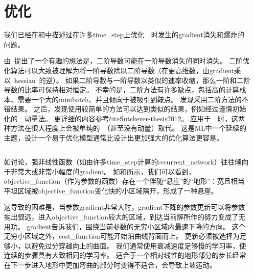 \section{优化}
\label{sec:optimization_for_long_term_dependencies}
我们已经在和中描述过在许多\gls{time_step}上优化~~时发生的\gls{gradient}消失和爆炸的问题。

由~\cite{Martens+Sutskever-ICML2011}提出了一个有趣的想法是，二阶导数可能在一阶导数消失的同时消失。
二阶优化算法可以大致被理解为将一阶导数除以二阶导数（在更高维数，由\gls{gradient}乘以~\gls{hessian}~的逆）。
如果二阶导数与一阶导数以类似的速率收缩，那么一阶和二阶导数的比率可保持相对恒定。
不幸的是，二阶方法有许多缺点，包括高的计算成本、需要一个大的\gls{minibatch}、并且倾向于被吸引到鞍点。
\cite{Martens+Sutskever-ICML2011}发现采用二阶方法的不错结果。
之后，\cite{sutskeverimportance}发现使用较简单的方法可以达到类似的结果，例如经过谨慎初始化的~~动量法。
更详细的内容参考\~cite{Sutskever-thesis2012}。
应用于~~时，这两种方法在很大程度上会被单纯的~（甚至没有动量）取代。
这是\gls{ML}中一个延续的主题，设计一个易于优化模型通常比设计出更加强大的优化算法更容易。


\subsection{}
\label{sec:clipping_gradients}
如讨论，强非线性函数（如由许多\gls{time_step}计算的\gls{recurrent_network}）往往倾向于非常大或非常小幅度的\gls{gradient}。
如和所示，我们可以看到，\gls{objective_function}（作为参数的函数）存在一个伴随``悬崖''的``地形''：宽且相当平坦区域被\gls{objective_function}变化快的小区域隔开，形成了一种悬崖。

这导致的困难是，当参数\gls{gradient}非常大时，\gls{gradient}下降的参数更新可以将参数抛出很远，进入\gls{objective_function}较大的区域，到达当前解所作的努力变成了无用功。
\gls{gradient}告诉我们，围绕当前参数的无穷小区域内最速下降的方向。
这个无穷小区域之外，\gls{cost_function}可能开始沿曲线背面而上。
更新必须被选择为足够小，以避免过分穿越向上的曲面。
我们通常使用衰减速度足够慢的学习率，使连续的步骤具有大致相同的学习率。
适合于一个相对线性的地形部分的步长经常在下一步进入地形中更加弯曲的部分时变得不适合，会导致上坡运动。

